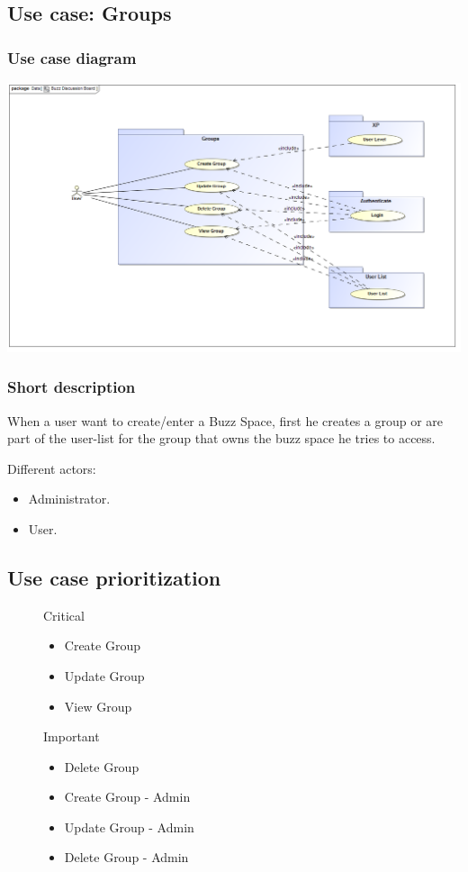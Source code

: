 

\subsection{Use case: Groups}
	\subsubsection{Use case diagram}
\includegraphics[width=\textwidth]{groups}
	\subsubsection{Short description}
	\begin{description}
		\item When a user want to create/enter a Buzz Space, first he creates a group or are part of the user-list for the group that owns the buzz space he tries to access. 


		\item[] Different actors:
		\begin{itemize}
			\item Administrator.
			\item User.   
		\end{itemize}
		
	\end{description}

	
	\subsection{Use case prioritization}
	\begin{description}
		\item[] Critical
		\begin{itemize}
			\item Create Group
			\item Update Group
			\item View Group
		\end{itemize}
		\item[] Important
		\begin{itemize}
			\item Delete Group
			\item Create Group - Admin
			\item Update Group - Admin
			\item Delete Group	 - Admin		
		\end{itemize}
	\end{description}
